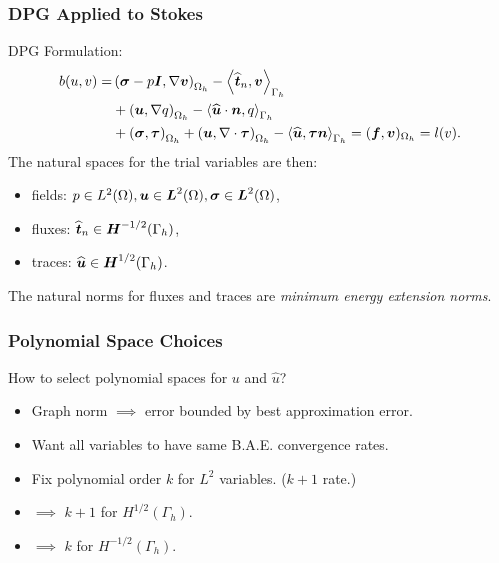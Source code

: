 \documentclass[mathserif]{beamer}
\newcommand{\NVRvect}[1]{\ensuremath\boldsymbol{#1}}
\newcommand{\vect}[1]{\ensuremath\boldsymbol{#1}}
\newcommand{\NVRtensor}[1]{\NVRvect{#1}}
\newcommand{\NVRgrad}{\nabla}
\newcommand{\NVRdiv}{\NVRgrad \cdot}
\begin{document}
\begin{frame}
\frametitle{DPG Applied to Stokes}
DPG Formulation:
\begin{align*}
b(u,v) =& \left(\NVRtensor{\sigma} - p \NVRtensor{I}, \NVRgrad \vect{v} \right)_{\Omega_{h}} - \left\langle \widehat{\vect{t}}_{n}, \vect{v} \right\rangle_{\Gamma_{h}}\\
&+\left(\vect{u}, \NVRgrad q \right)_{\Omega_{h}} -  \left\langle \widehat{\vect{u}} \cdot \vect{n}, q  \right\rangle_{\Gamma_{h}}\\
&+ \left( \NVRtensor{\sigma}, \NVRtensor{\tau} \right)_{\Omega_{h}} + \left( \vect{u}, \NVRdiv \NVRtensor{\tau} \right)_{\Omega_{h}} - \left\langle \widehat{\vect{u}}, \NVRtensor{\tau} \vect{n}  \right\rangle_{\Gamma_{h}} = (\vect{f}, \vect{v} )_{\Omega_{h}} = l(v).
\end{align*}
The natural spaces for the trial variables are then:
\begin{itemize}
\item fields: $p \in L^{2}(\Omega), \vect{u} \in \vect{L}^{2}(\Omega), \NVRtensor{\sigma} \in \vect{L}^{2}(\Omega)$,
\item fluxes: $\widehat{\vect{t}}_{n} \in \NVRtensor{H}^{-1/2}(\Gamma_{h})$,
\item traces: $\widehat{\vect{u}} \in \vect{H}^{1/2}(\Gamma_{h})$.
\end{itemize}

The natural norms for fluxes and traces are \emph{minimum energy extension norms}.

\end{frame}

\begin{frame}
\frametitle{Polynomial Space Choices}
How to select polynomial spaces for $u$ and $\widehat{u}$?
\begin{itemize}
\item Graph norm $\implies$ error bounded by best approximation error.
\vspace{3mm} \pause
\item Want all variables to have same B.A.E. convergence rates.
\vspace{3mm} \pause
\item Fix polynomial order $k$ for $L^{2}$ variables.  ($k+1$ rate.)
\vspace{3mm} \pause
\item $\implies$ $k+1$ for $H^{1/2}(\Gamma_{h})$.
\vspace{3mm} \pause
\item $\implies$ $k$ for $H^{-1/2}(\Gamma_{h})$.
\end{itemize}
\end{frame}
\end{document}
